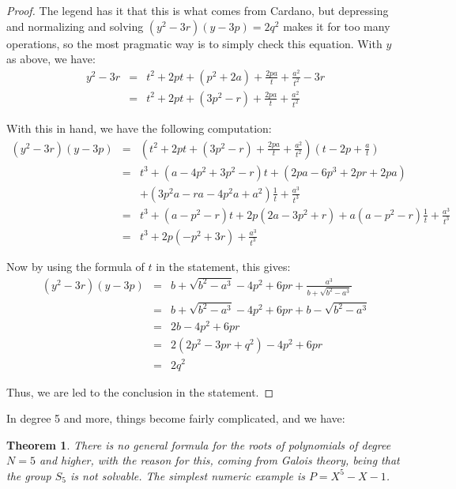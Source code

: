 \documentclass[12pt]{amsbook}
\newtheorem{theorem}{Theorem}[chapter]
\begin{document}
\begin{proof}
The legend has it that this is what comes from Cardano, but depressing and normalizing and solving $(y^2-3r)(y-3p)=2q^2$ makes it for too many operations, so the most pragmatic way is to simply check this equation. With $y$ as above, we have:
\begin{eqnarray*}
y^2-3r
&=&t^2+2pt+(p^2+2a)+\frac{2pa}{t}+\frac{a^2}{t^2}-3r\\
&=&t^2+2pt+(3p^2-r)+\frac{2pa}{t}+\frac{a^2}{t^2}
\end{eqnarray*}

With this in hand, we have the following computation:
\begin{eqnarray*}
(y^2-3r)(y-3p)
&=&\left(t^2+2pt+(3p^2-r)+\frac{2pa}{t}+\frac{a^2}{t^2}\right)\left(t-2p+\frac{a}{t}\right)\\
&=&t^3+(a-4p^2+3p^2-r)t+(2pa-6p^3+2pr+2pa)\\
&&+(3p^2a-ra-4p^2a+a^2)\frac{1}{t}+\frac{a^3}{t^3}\\
&=&t^3+(a-p^2-r)t+2p(2a-3p^2+r)+a(a-p^2-r)\frac{1}{t}+\frac{a^3}{t^3}\\
&=&t^3+2p(-p^2+3r)+\frac{a^3}{t^3}
\end{eqnarray*}

Now by using the formula of $t$ in the statement, this gives:
\begin{eqnarray*}
(y^2-3r)(y-3p)
&=&b+\sqrt{b^2-a^3}-4p^2+6pr+\frac{a^3}{b+\sqrt{b^2-a^3}}\\
&=&b+\sqrt{b^2-a^3}-4p^2+6pr+b-\sqrt{b^2-a^3}\\
&=&2b-4p^2+6pr\\
&=&2(2p^2-3pr+q^2)-4p^2+6pr\\
&=&2q^2
\end{eqnarray*}

Thus, we are led to the conclusion in the statement.
\end{proof}

In degree 5 and more, things become fairly complicated, and we have:


\begin{theorem}
There is no general formula for the roots of polynomials of degree $N=5$ and higher, with the reason for this, coming from Galois theory, being that the group $S_5$ is not solvable. The simplest numeric example is $P=X^5-X-1$.
\end{theorem}
\end{document}
